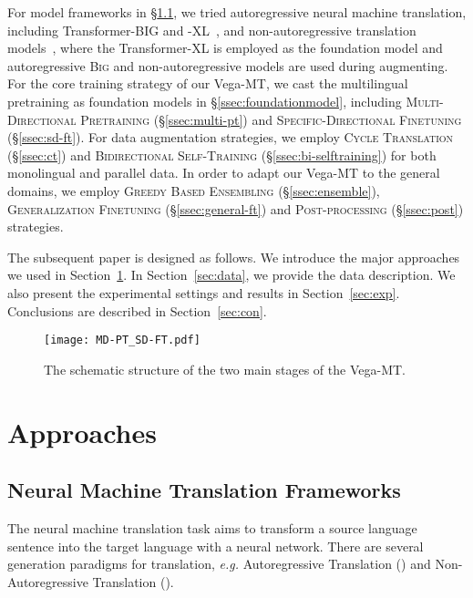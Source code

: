 \documentclass[11pt,a4paper]{article}
\newcommand{\zct}{\color{black}}
\begin{document}
For model frameworks in \S\ref{ssec:nmt}, we tried autoregressive neural machine translation, including Transformer-\textsc{BIG} and -\textsc{XL}~\cite{transformer}, and non-autoregressive translation models~\cite{gu2018non}, where the Transformer-\textsc{XL} is employed as the foundation model and autoregressive \textsc{Big} and {\zct non-autoregressive} models are used during augmenting. 
For the core training strategy of our Vega-MT, we cast the multilingual pretraining as foundation models in \S\ref{ssec:foundationmodel}, including \textsc{Multi-Directional Pretraining} (\S\ref{ssec:multi-pt}) and \textsc{Specific-Directional Finetuning} (\S\ref{ssec:sd-ft}). 
For data augmentation strategies, we employ \textsc{Cycle Translation} (\S\ref{ssec:ct}) and \textsc{Bidirectional Self-Training} (\S\ref{ssec:bi-selftraining}) for both monolingual and parallel data.
In order to adapt our Vega-MT to the general domains, we employ \textsc{Greedy Based Ensembling} (\S\ref{ssec:ensemble}), \textsc{Generalization Finetuning} (\S\ref{ssec:general-ft}) and \textsc{Post-processing} (\S\ref{ssec:post}) strategies.

The subsequent paper is designed as follows. We introduce the major approaches we used in Section~\ref{sec:app}. In Section~\ref{sec:data}, we provide the data description. We also present the  experimental settings and results in Section~\ref{sec:exp}. Conclusions are described in Section~\ref{sec:con}.


\begin{figure*}[htb]
    \centering
    \texttt{[image: MD-PT\_SD-FT.pdf]}
    \caption{The schematic structure of the two main stages of the Vega-MT. }
    \label{fig:system}
\end{figure*}

\section{Approaches}
\label{sec:app}

\subsection{Neural Machine Translation Frameworks}
\label{ssec:nmt}
The neural machine translation task aims to transform a source language sentence into the target language with a neural network. There are several generation paradigms for translation, \textit{e.g.} Autoregressive Translation (\citealp[AT,][]{rnnsearch,transformer}) and Non-Autoregressive Translation (\citealp[NAT,][]{gu2018non}).
\end{document}
